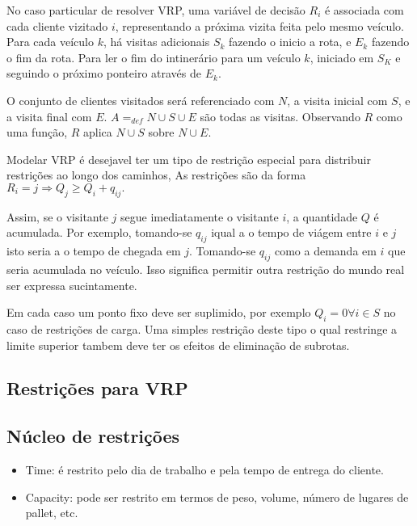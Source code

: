 \documentclass[a4paper, 12pt]{article}
\begin{document}
 No caso particular de resolver VRP, uma variável de decisão $R_i$ é associada com cada cliente
vizitado $i$, representando a próxima vizita feita pelo mesmo veículo. Para cada veículo $k$, há
visitas adicionais $S_k$ fazendo o inicio a rota, e $E_k$ fazendo o fim da rota. Para ler o fim do
intinerário para um veículo $k$, iniciado em $S_K$ e seguindo o próximo ponteiro através de $E_k$.

 O conjunto de clientes visitados será referenciado com $N$, a visita inicial com $S$, e a visita
final com $E$. $A =_{def} N\cup S\cup E$ são todas as visitas. Observando $R$ como uma função, $R$
aplica $N\cup S$ sobre $N\cup E$.

 Modelar VRP é desejavel ter um tipo de restrição especial para distribuir restrições ao longo dos
caminhos, As restrições são da forma $R_i = j \Rightarrow Q_j \geq Q_i + q_{ij}.$  

 Assim, se o visitante $j$ segue imediatamente o visitante $i$, a quantidade $Q$ é acumulada. Por
exemplo, tomando-se $q_{ij}$ iqual a o tempo de viágem entre $i$ e $j$ isto seria a o tempo de
chegada em $j$. Tomando-se $q_{ij}$ como a demanda em $i$ que seria acumulada no veículo. Isso
significa permitir outra restrição do mundo real ser expressa sucintamente.

 Em cada caso um ponto fixo deve ser suplimido, por exemplo $Q_i = 0 \forall i\in S$ no caso de
restrições de carga. Uma simples restrição deste tipo o qual restringe a limite superior tambem deve
ter os efeitos de eliminação de subrotas.

\subsection{Restrições para VRP}

\subsection{Núcleo de restrições}

\begin{itemize}
\item Time: é restrito pelo dia de trabalho e pela tempo de entrega do cliente.
\item Capacity: pode ser restrito em termos de peso, volume, número de lugares de pallet, etc.
\end{itemize}
\end{document}
